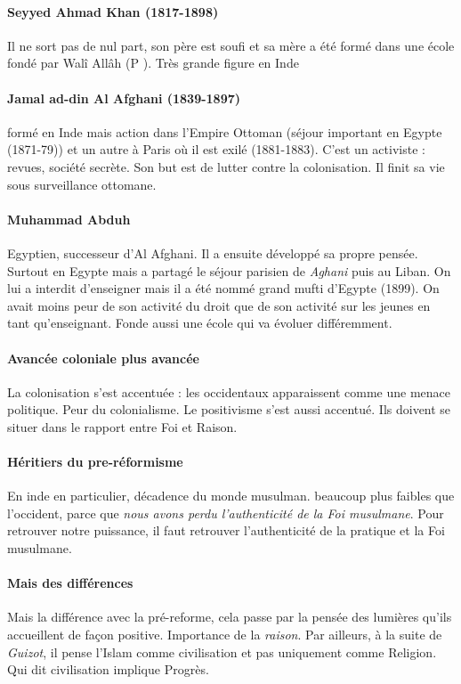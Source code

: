    \paragraph{Seyyed Ahmad Khan (1817-1898)} Il ne sort pas de nul part, son père est soufi et sa mère a été formé dans une école fondé par Walî Allâh (P \pageref{Theo:waliAllah}). Très grande figure en Inde
   
   \paragraph{Jamal ad-din Al Afghani (1839-1897)} formé en Inde mais action dans l'Empire Ottoman (séjour important en Egypte (1871-79)) et un autre à Paris où il est exilé (1881-1883). C'est un activiste  : revues, société secrète. Son but est de lutter contre la colonisation. Il finit sa vie sous surveillance ottomane.
   
    \paragraph{Muhammad Abduh} Egyptien, successeur d'Al Afghani. Il a ensuite développé sa propre pensée. Surtout en Egypte mais a partagé le séjour parisien de \textit{Aghani} puis au Liban. On lui a interdit d'enseigner mais il a été nommé grand mufti d'Egypte (1899). On avait moins peur de son activité du droit que de son activité sur les jeunes en tant qu'enseignant. Fonde aussi une école qui va évoluer différemment. 
    
    \paragraph{Avancée coloniale plus avancée} La colonisation s'est accentuée : les occidentaux apparaissent comme une menace politique. Peur du colonialisme. Le positivisme s'est aussi accentué. Ils doivent se situer dans le rapport entre Foi et Raison. 
   
   \paragraph{Héritiers du pre-réformisme} En inde en particulier, décadence du monde musulman. beaucoup plus faibles que l'occident, parce que \textit{nous avons perdu l'authenticité de la Foi musulmane}. Pour retrouver notre puissance, il faut retrouver l'authenticité de la pratique et la Foi musulmane.
   
   \paragraph{Mais des différences} Mais la différence avec la pré-reforme, cela passe par la pensée des lumières qu'ils accueillent de façon positive. Importance de la \textit{raison}. Par ailleurs, à la suite de \textit{Guizot}, il pense l'Islam comme civilisation et pas uniquement comme Religion. Qui dit civilisation implique Progrès. 
   
